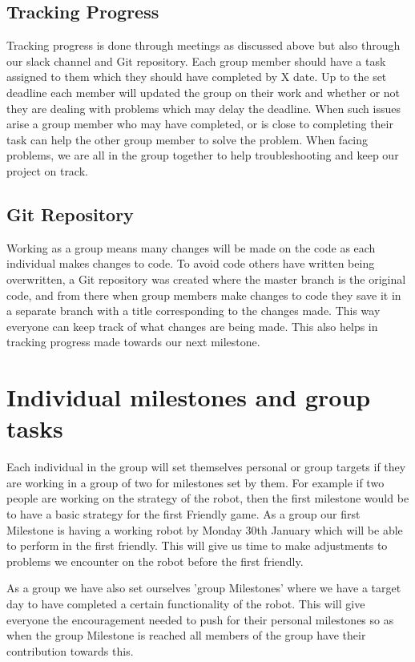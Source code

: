 \documentclass{article}
\begin{document}
\subsection{Tracking Progress}
Tracking progress is done through meetings as discussed above but also through
our slack channel and Git repository. Each group member should have a task
assigned to them which they should have completed by X date. Up to the set
deadline each member will updated the group on their work and whether or not
they are dealing with problems which may delay the deadline. When such issues
arise a group member who may have completed, or is close to completing their
task can help the other group member to solve the problem. When facing problems,
we are all in the group together to help troubleshooting and keep our project on
track.

\subsection{Git Repository}
Working as a group means many changes will be made on the code as each
individual makes changes to code. To avoid code others have written being
overwritten, a Git repository was created where the master branch is the
original code, and from there when group members make changes to code they save
it in a separate branch with a title corresponding to the changes made. This way
everyone can keep track of what changes are being made. This also helps in
tracking progress made towards our next milestone.


\section{Individual milestones and group tasks}
Each individual in the group will set themselves personal or group targets if
they are working in a group of two for milestones set by them. For example if
two people are working on the strategy of the robot, then the first milestone
would be to have a basic strategy for the first Friendly game. As a group our
first Milestone is having a working robot by Monday 30th January which will be
able to perform in the first friendly. This will give us time to make
adjustments to problems we encounter on the robot before the first friendly.

As a group we have also set ourselves 'group Milestones' where we have a target
day to have completed a certain functionality of the robot. This will give
everyone the encouragement needed to push for their personal milestones so as
when the group Milestone is reached all members of the group have their
contribution towards this.
\end{document}
